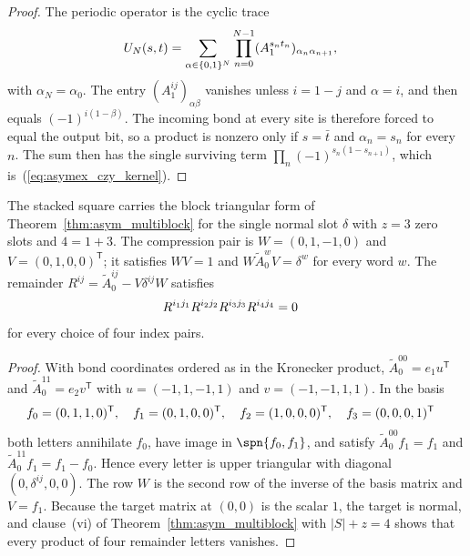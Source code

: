 \begin{proof}
    \leanok
    The periodic operator is the cyclic trace
    \begin{align}
        U_N(s,t) & =\sum_{\alpha\in\{0,1\}^N}\prod_{n=0}^{N-1}
        (A_1^{s_nt_n})_{\alpha_n\alpha_{n+1}},
        \notag
    \end{align}
    with $\alpha_N=\alpha_0$. The entry $(A_1^{ij})_{\alpha\beta}$ vanishes
    unless $i=1-j$ and $\alpha=i$, and then equals $(-1)^{i(1-\beta)}$. The
    incoming bond at every site is therefore forced to equal the output bit,
    so a product is nonzero only if $s=\bar t$ and $\alpha_n=s_n$ for every
    $n$. The sum then has the single surviving term
    $\prod_n(-1)^{s_n(1-s_{n+1})}$, which is~(\ref{eq:asymex_czy_kernel}).
\end{proof}

\begin{lemma}
    \label{thm:asymex_czy_compression}
    \leanok
    The stacked square carries the block triangular form of
    Theorem~\ref{thm:asym_multiblock} for the single normal slot $\delta$
    with $z=3$ zero slots and $4=1+3$. The compression pair is
    $W=(0,1,-1,0)$ and $V=(0,1,0,0)^{\mathsf T}$; it satisfies $WV=1$ and
    $W\widetilde A_0^wV=\delta^w$ for every word $w$. The remainder
    $R^{ij}=\widetilde A_0^{ij}-V\delta^{ij}W$ satisfies
    \begin{align}
        R^{i_1j_1}R^{i_2j_2}R^{i_3j_3}R^{i_4j_4} & =0
        \notag
    \end{align}
    for every choice of four index pairs.
\end{lemma}

\begin{proof}
    \leanok
    With bond coordinates ordered as in the Kronecker product,
    $\widetilde A_0^{00}=e_1u^{\mathsf T}$ and
    $\widetilde A_0^{11}=e_2v^{\mathsf T}$ with $u=(-1,1,-1,1)$ and
    $v=(-1,-1,1,1)$. In the basis
    \begin{align}
        f_0 & =(0,1,1,0)^{\mathsf T},\quad f_1=(0,1,0,0)^{\mathsf T},\quad
        f_2=(1,0,0,0)^{\mathsf T},\quad f_3=(0,0,0,1)^{\mathsf T}
        \notag
    \end{align}
    both letters annihilate $f_0$, have image in $\spn\{f_0,f_1\}$, and
    satisfy $\widetilde A_0^{00}f_1=f_1$ and
    $\widetilde A_0^{11}f_1=f_1-f_0$.    Hence every letter is upper
    triangular with diagonal $(0,\delta^{ij},0,0)$. The row $W$ is the
    second row of the inverse of the basis matrix and $V=f_1$. Because
    the target matrix at $(0,0)$ is the scalar $1$, the target is normal,
    and clause~(vi) of Theorem~\ref{thm:asym_multiblock} with $|S|+z=4$
    shows that every product of four remainder letters vanishes.
\end{proof}

